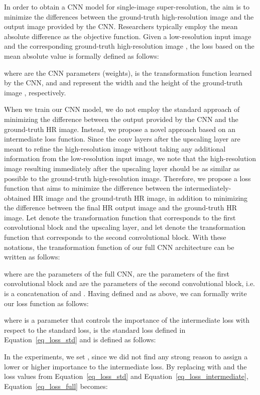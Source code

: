 \documentclass{ieeeaccess}
\begin{document}
In order to obtain a CNN model for single-image super-resolution, the aim is to minimize the differences between the ground-truth high-resolution image and the output image provided by the CNN. Researchers typically employ the mean absolute difference as the objective function. Given a low-resolution input image  and the corresponding ground-truth high-resolution image , the loss based on the mean absolute value is formally defined as follows:

where  are the CNN parameters (weights),  is the transformation function learned by the CNN, and  and  represent the width and the height of the ground-truth image , respectively. 

When we train our CNN model, we do not employ the standard approach of minimizing the difference between the output provided by the CNN and the ground-truth HR image. Instead, we propose a novel approach based on an intermediate loss function. Since the conv layers after the upscaling layer are meant to refine the high-resolution image without taking any additional information from the low-resolution input image, we note that the high-resolution image resulting immediately after the upscaling layer should be as similar as possible to the ground-truth high-resolution image. Therefore, we propose a loss function that aims to minimize the difference between the intermediately-obtained HR image and the ground-truth HR image, in addition to minimizing the difference between the final HR output image and the ground-truth HR image. Let  denote the transformation function that corresponds to the first convolutional block and the upscaling layer, and let  denote the transformation function that corresponds to the second convolutional block. With these notations, the transformation function  of our full CNN architecture can be written as follows:

where  are the parameters of the full CNN,  are the parameters of the first convolutional block and  are the parameters of the second convolutional block, i.e.  is a concatenation of  and . Having defined  and  as above, we can formally write our loss function as follows:

where  is a parameter that controls the importance of the intermediate loss with respect to the standard loss,  is the standard loss defined in Equation~\eqref{eq_loss_std} and  is defined as follows:


In the experiments, we set , since we did not find any strong reason to assign a lower or higher importance to the intermediate loss. By replacing  with  and the loss values from Equation~\eqref{eq_loss_std} and Equation~\eqref{eq_loss_intermediate}, Equation~\eqref{eq_loss_full} becomes:
\end{document}
